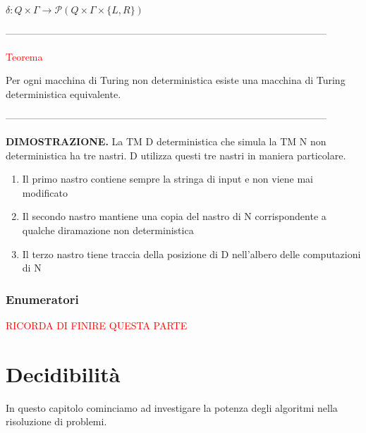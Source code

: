 \documentclass{article}
\begin{document}
\begin{center}
    $\delta: Q \times \Gamma \rightarrow \mathcal{P}(Q \times \Gamma \times \{L, R\})$
\end{center}

--------------------------------------------------------------------------------------------------

\begin{center}
    \textcolor{red}{Teorema}
\end{center}

Per ogni macchina di Turing non deterministica esiste una macchina di Turing deterministica equivalente.

--------------------------------------------------------------------------------------------------

\textbf{DIMOSTRAZIONE.}  La TM D deterministica che simula la TM N non deterministica ha tre nastri. D utilizza questi tre nastri in maniera particolare.

\begin{enumerate}
    \item Il primo nastro contiene sempre la stringa di input e non viene mai modificato
    \item Il secondo nastro mantiene una copia del nastro di N corrispondente a qualche diramazione non deterministica
    \item Il terzo nastro tiene traccia della posizione di D nell'albero delle computazioni di N
\end{enumerate}

\subsubsection{Enumeratori}

\textcolor{red}{RICORDA DI FINIRE QUESTA PARTE}

\section{Decidibilità}

In questo capitolo cominciamo ad investigare la potenza degli algoritmi nella risoluzione di problemi.
\end{document}
